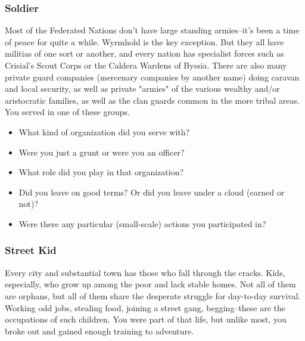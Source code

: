 \subsubsection{Soldier}

Most of the Federated Nations don't have large standing armies--it's been a time of peace for quite a while. Wyrmhold is the key exception. But they all have militias of one sort or another, and every nation has specialist forces such as Crisial's Scout Corps or the Caldera Wardens of Byssia. There are also many private guard companies (mercenary companies by another name) doing caravan and local security, as well as private "armies" of the various wealthy and/or aristocratic families, as well as the clan guards common in the more tribal areas. You served in one of these groups.

\begin{itemize}
	\item What kind of organization did you serve with?
	\item Were you just a grunt or were you an officer?
	\item What role did you play in that organization?
	\item Did you leave on good terms? Or did you leave under a cloud (earned or not)?
	\item Were there any particular (small-scale) actions you participated in?
\end{itemize}

\subsubsection{Street Kid}

Every city and substantial town has those who fall through the cracks. Kids, especially, who grow up among the poor and lack stable homes. Not all of them are orphans, but all of them share the desperate struggle for day-to-day survival. Working odd jobs, stealing food, joining a street gang, begging--these are the occupations of such children. You were part of that life, but unlike most, you broke out and gained enough training to adventure.

